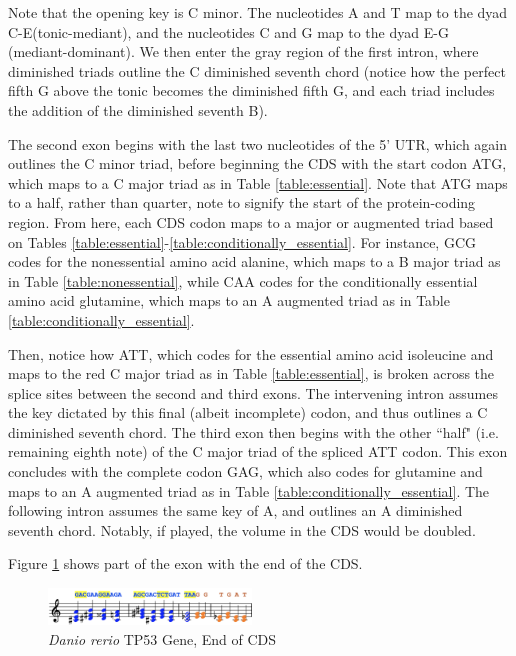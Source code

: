 \documentclass[letterpaper]{article}
\begin{document}
Note that the opening key is C minor. The nucleotides  A and T map to the dyad C-E\musFlat \;(tonic-mediant), and the nucleotides C and G map to the dyad E\musFlat-G (mediant-dominant). We then enter the gray region of the first intron, where diminished triads outline the C diminished seventh chord (notice how the perfect fifth G above the tonic becomes the diminished fifth G\musFlat, and each triad includes the addition of the diminished seventh B\musDoubleFlat).


The second exon begins with the last two nucleotides of the 5’ UTR, which again outlines the C minor triad, before beginning the CDS with the start codon ATG, which maps to a C major triad as in Table \ref{table:essential}. Note that ATG maps to a half, rather than quarter, note to signify the start of the protein-coding region. From here, each CDS codon maps to a major or augmented triad based on Tables  \ref{table:essential}-\ref{table:conditionally_essential}. For instance, GCG codes for the nonessential amino acid alanine, which maps to a B\musFlat\; major triad as in Table \ref{table:nonessential}, while CAA codes for the conditionally essential amino acid glutamine, which maps to an A augmented triad as in Table \ref{table:conditionally_essential}.

Then, notice how ATT, which codes for the essential amino acid isoleucine and maps to the red C\musSharp\; major triad as in Table \ref{table:essential}, is broken across the splice sites between the second and third exons. The intervening intron assumes the key dictated by this final (albeit incomplete) codon, and thus outlines a C\musSharp \; diminished seventh chord. The third exon then begins with the other ``half" (i.e.  remaining eighth note) of the C\musSharp\; major triad of the spliced ATT codon. This exon concludes with the complete codon GAG, which also codes for glutamine and maps to an A augmented triad as in Table \ref{table:conditionally_essential}. The following intron assumes the same key of A, and outlines an A \; diminished seventh chord. Notably, if played, the volume in the CDS would be doubled.

Figure \ref{fig:danio_rerio_end_translation} shows part of the exon with the end of the CDS. 

\begin{figure}[h!]
\centering
\vspace{-4mm}
\includegraphics[width=0.48\textwidth]{images/danio_rerio_end_translation}
  \caption{\textit{Danio rerio} TP53 Gene, End of CDS}
  \label{fig:danio_rerio_end_translation}
  \vspace{-4mm}
\end{figure}
\end{document}
